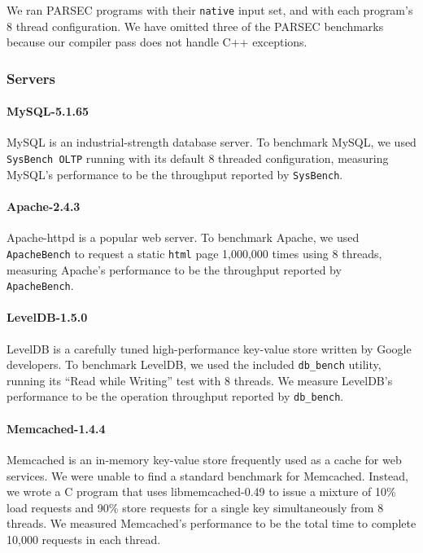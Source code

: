 \documentclass[preprint,9pt]{sigplanconf}
\begin{document}
We ran PARSEC programs with their {\tt native} input set, and with each
program's 8 thread configuration. We have omitted three of the PARSEC
benchmarks because our compiler pass does not handle C++ exceptions.    

\subsubsection{Servers}


\paragraph{MySQL-5.1.65} MySQL is an industrial-strength database
server. To benchmark MySQL, we used {\tt SysBench OLTP} running with its
default 8 threaded configuration, measuring MySQL's performance to be the
throughput reported by {\tt SysBench}.  

\paragraph{Apache-2.4.3} 
Apache-httpd is a popular web server.  To benchmark Apache, we used {\tt
ApacheBench} to request a static {\tt html} page 1,000,000 times using 8 threads,
measuring Apache's performance to be the throughput reported by {\tt
ApacheBench}.  

\paragraph{LevelDB-1.5.0}
LevelDB is a carefully tuned high-performance key-value store written by Google
developers. To benchmark LevelDB, we used the included {\tt db\_bench} utility,
running its ``Read while Writing'' test with 8 threads.  We measure LevelDB's
performance to be the operation throughput reported by {\tt db\_bench}.

\paragraph{Memcached-1.4.4}
Memcached is an in-memory key-value store frequently used as a cache for web
services.  We were unable to find a standard benchmark for Memcached.  Instead,
we wrote a C program that uses libmemcached-0.49 to issue a
mixture of 10\% load requests and 90\% store requests for a single key 
simultaneously from 8 threads.  We measured Memcached's performance to be the
total time to complete 10,000 requests in each thread.
\end{document}

